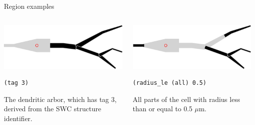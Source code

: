 \documentclass[aspectratio=43]{beamer}
\begin{document}
\begin{frame}[fragile]{Region examples}
    \begin{columns}[T]
        \begin{column}{0.5\textwidth}
            \includegraphics[width=\textwidth]{images/reg_tag3.png}

            \vspace{10pt}

            \begin{lstlisting}[style=arblang]
(tag 3)
            \end{lstlisting}

            The dendritic arbor, which has tag 3, derived from the SWC structure identifier.

        \end{column}
        \begin{column}{0.5\textwidth}
            \includegraphics[width=\textwidth]{images/reg_radle5.png}

            \vspace{10pt}

            \begin{lstlisting}[style=arblang]
(radius_le (all) 0.5)
            \end{lstlisting}
            All parts of the cell with radius less than or equal to 0.5 $\mu$m.

        \end{column}
    \end{columns}
\end{frame}
\end{document}
